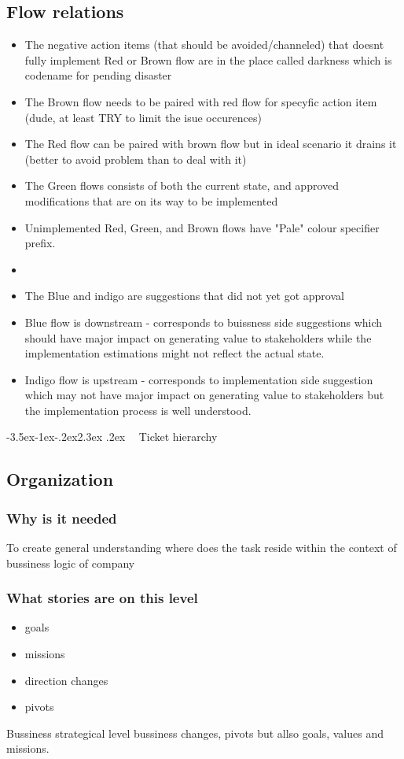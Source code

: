 \documentclass[12pt,a4paper,twoside]{article}
\makeatletter
\def\section{\@startsection{section}{1}{\z@ }%
  {-3.5ex\@plus -1ex\@minus -.2ex}{2.3ex \@plus .2ex}%
  {\noindent\normalfont \Large \bfseries \ }%
}
\makeatother
\begin{document}
\subsection{Flow relations}
\begin{itemize}
  \item The negative action items (that should be avoided/channeled) that doesnt fully implement 
  Red or Brown flow are in the place called darkness which is codename for pending disaster
  \item The Brown flow needs to be paired with red flow for specyfic action item (dude, at least TRY to limit the isue occurences)
  \item The Red flow can be paired with brown flow but in ideal scenario it drains it (better to avoid problem than to deal with it)
  \item The Green flows consists of both the current state, and approved modifications that are on its way to be implemented
  \item Unimplemented Red, Green, and Brown flows have "Pale" colour specifier prefix.
  \item 
  \item The Blue and indigo are suggestions that did not yet got approval
  \item Blue flow is downstream - corresponds to buissness side suggestions which should have major impact on generating value to stakeholders while the implementation estimations might not reflect the actual state.
  \item Indigo flow is upstream - corresponds to implementation side suggestion which may not have major impact on generating value to stakeholders but the implementation process is well understood.
\end{itemize}
\newpage
\section{Ticket hierarchy}
\subsection{Organization}
\subsubsection{Why is it needed}
To create general understanding  where does the task reside within the context of bussiness logic of company
\subsubsection{What stories are on this level}
\begin{itemize}
    \item goals
    \item missions
    \item direction changes
    \item pivots
\end{itemize}
Bussiness strategical level bussiness changes, pivots but allso goals, values and missions.
\end{document}
